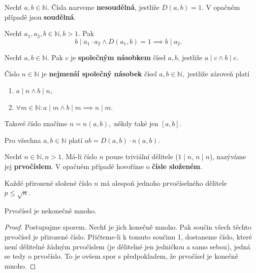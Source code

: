 \begin{definition}
  Nechť $a,b\in \mathbb N.$ Čísla nazveme \textbf{nesoudělná}, jestliže $D(a,b)=1$. V opačném případě jsou \textbf{soudělná}.
\end{definition}

\begin{veta}
  Nechť $a_1,a_2,b\in \mathbb N, b>1.$ Pak
  $$b \mid a_1 \cdot a_2 \land D(a_1,b)=1\implies b\mid a_2.$$
\end{veta}

\begin{definition}
  Nechť $a,b\in \mathbb N.$ Pak $c$ je \textbf{společným násobkem} čísel $a,b$, jestliže $a \mid c \land b\mid c.$
\end{definition}

\begin{definition}
  Číslo $n\in \mathbb N$ je \textbf{nejmenší společný násobek} čísel $a,b \in \mathbb N,$ jestliže zároveň platí
  \begin{enumerate}[$i.$]
    \item $a\mid n \land b \mid n$,
    \item $\forall m \in \mathbb N\colon a \mid m \land b \mid m \implies n \mid m.$
  \end{enumerate}
  Takové číslo značíme $n=n(a,b), $ někdy také jen $\left [ a,b\right ]$.
\end{definition}

\begin{veta}
  Pro všechna $a,b \in \mathbb N$ platí $ab=D(a,b)\cdot n(a,b).$
\end{veta}

\begin{definition}
  Nechť $n\in \mathbb N, n>1.$ Má-li číslo $n$ pouze triviální dělitele ($1 \mid n$, $n \mid n$), nazýváme jej \textbf{prvočíslem}. V opačném případě hovoříme o \textbf{čísle složeném}.
\end{definition}

\begin{veta}
  Každé přirozené složené číslo $n$ má alespoň jednoho prvočíselného dělitele $p\leq \sqrt{n}$.
\end{veta}

\begin{veta}
  Prvočísel je nekonečně mnoho.
\end{veta}

\begin{proof}
  Postupujme sporem. Nechť je jich konečně mnoho. Pak součin všech těchto prvočísel je přirozené číslo.
  Přičteme-li k tomuto součinu 1, dostaneme číslo, které není dělitelné žádným prvočíslem (je dělitelné jen
  jedničkou a samo sebou), jedná se tedy o prvočíslo. To je ovšem spor s předpokladem, že prvočísel je konečně mnoho.
\end{proof}

